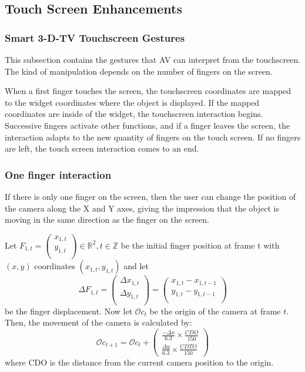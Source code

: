 \documentclass[12pt]{extarticle}
\newcommand{\R}{\mathbb{R}}
\newcommand{\Z}{\mathbb{Z}}
\begin{document}
\subsection {Touch Screen Enhancements}

\subsubsection {Smart 3-D-TV Touchscreen Gestures}
This subsection contains the gestures that AV can interpret from the touchscreen. The kind of manipulation depends on the number of fingers on the screen. 

When a first finger touches the screen, the touchscreen coordinates are mapped to the widget coordinates where the object is displayed. If the mapped coordinates are inside of the widget, the touchscreen interaction begins. Successive fingers activate other functions, and if a finger leaves the screen, the interaction adapts to the new quantity of fingers on the touch screen. If no fingers are left, the touch screen interaction comes to an end.

\subsubsection* {One finger interaction}
If there is only one finger on the screen, then the user can change the position of the camera along the X and Y axes, giving the impression that the object is moving in the same direction as the finger on the screen.

Let $F_{1,t}=\begin{pmatrix} x_{1,t}\\y_{1,t}\\ \end{pmatrix} \in \R^2, t\in \Z$ be the initial finger position at frame t with $(x,y)$ coordinates $(x_{1,t},y_{1,t})$ and let $$\Delta F_{1,t}=\begin{pmatrix} \Delta x_{1,t}\\\Delta y_{1,t}\\ \end{pmatrix}=\begin{pmatrix} x_{1,t}-x_{1,t-1}\\y_{1,t}-y_{1,t-1}\\ \end{pmatrix}$$ be the finger displacement. Now let $\mathcal Oc_t$ be the origin of the camera at frame $t$. Then, the movement of the camera is calculated by:
$$\mathcal Oc_{t+1}=\mathcal Oc_t+\begin{pmatrix}\frac{-\Delta x }{6.3}\times\frac {CDO}{150}\\\frac{\Delta y }{6.3}\times\frac {CDTO}{150}\end{pmatrix}$$
where CDO is the distance from the current camera position to the origin.
\end{document}
